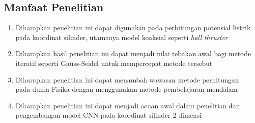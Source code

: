 \subsection{Manfaat Penelitian}
\begin{enumerate}
  \item Diharapkan penelitian ini dapat digunakan pada perhitungan potensial listrik
    pada koordinat silinder, utamanya model koaksial seperti \emph{hall thruster}

  \item Diharapkan hasil penelitian ini dapat menjadi nilai tebakan awal bagi metode
    iteratif seperti Gauss-Seidel untuk mempercepat metode tersebut

  \item Diharapkan penelitian ini dapat menambah wawasan metode perhitungan pada
    dunia Fisika dengan menggunakan metode pembelajaran mendalam

  \item Diharapkan penelitian ini dapat menjadi acuan awal dalam penelitian dan pengembangan
    model CNN pada koordinat silinder 2 dimensi
\end{enumerate}